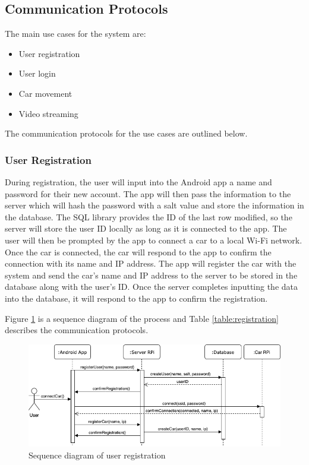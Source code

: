 \documentclass[letterpaper,12pt]{report}
\begin{document}
    \subsection{Communication Protocols} \label{ssec:communication}

    The main use cases for the system are:
    \begin{itemize}
            \item User registration
            \item User login
            \item Car movement
            \item Video streaming
    \end{itemize}

    The communication protocols for the use cases are outlined below.

    \subsubsection{User Registration}

    During registration, the user will input into the Android app a name and
    password for their new account. The app will then pass the information to
    the server which will hash the password with a salt value and store the
    information in the database. The SQL library provides the ID of the last
    row modified, so the server will store the user ID locally as long as it
    is connected to the app. The user will then be prompted by the app to
    connect a car to a local Wi-Fi network. Once the car is connected, the
    car will respond to the app to confirm the connection with its name and
    IP address. The app will register the car with the system and send the
    car’s name and IP address to the server to be stored in the database
    along with the user’s ID. Once the server completes inputting the data
    into the database, it will respond to the app to confirm the
    registration.

    Figure \ref{fig:registration} is a sequence diagram of the process and Table
    \ref{table:registration} describes the communication protocols.

    \begin{figure}[H]
        \centering
        \includegraphics[width=0.9\linewidth]{diagrams/Design_Registration_Sequence.png}
        \caption{Sequence diagram of user registration}
        \label{fig:registration}
    \end{figure}
\end{document}
